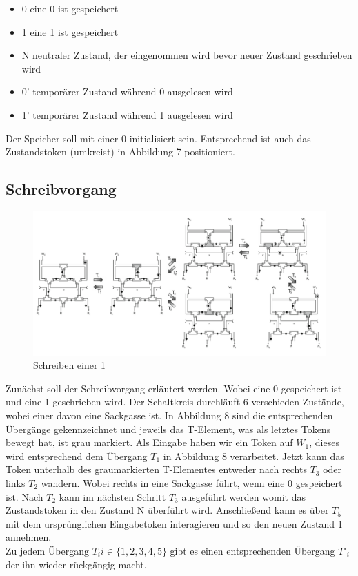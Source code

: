 \documentclass[11pt,a4paper]{article}
\begin{document}
\begin{itemize}
    \item 0 eine 0 ist gespeichert
    \item 1 eine 1 ist gespeichert 
    \item N neutraler Zustand, der eingenommen wird bevor
        neuer Zustand geschrieben wird
    \item 0' temporärer Zustand während 0 ausgelesen wird
    \item 1' temporärer Zustand während 1 ausgelesen wird
\end{itemize}

Der Speicher soll mit einer 0 initialisiert sein.
%
Entsprechend ist auch das Zustandstoken (umkreist) in Abbildung 7 positioniert.


\subsection{Schreibvorgang}

\begin{figure}[h]
      \includegraphics[width=14cm]{bilder/write1Mem.png} 
      \caption{Schreiben einer 1}
\end{figure}

Zunächst soll der Schreibvorgang erläutert werden.
%
Wobei eine 0 gespeichert ist und eine 1 geschrieben wird.
%
Der Schaltkreis durchläuft 6 verschieden Zustände, wobei einer 
davon eine Sackgasse ist.
%
In Abbildung 8 sind die entsprechenden Übergänge gekennzeichnet 
und jeweils das T-Element, was als letztes Tokens bewegt hat, ist grau markiert.
%
Als Eingabe haben wir ein Token auf $ W_{1} $, dieses wird entsprechend 
dem Übergang $ T_{1} $ in Abbildung 8 verarbeitet.
%
Jetzt kann das Token unterhalb des graumarkierten T-Elementes entweder
nach rechts $ T_{3} $ oder links $ T_{2} $ wandern. 
%
Wobei rechts in eine Sackgasse führt, wenn eine 0 gespeichert ist.
%
Nach $ T_{2} $ kann im nächsten Schritt $ T_{3} $ ausgeführt werden
womit das Zustandstoken in den Zustand N überführt wird.
%
Anschließend kann es über $ T_{5} $ mit dem ursprünglichen Eingabetoken
interagieren und so den neuen Zustand 1 annehmen. \\
%
Zu jedem Übergang $ T_{i} i \in \{1, 2, 3, 4, 5\} $ gibt es einen 
entsprechenden Übergang $ T'_{i} $ der ihn wieder rückgängig macht.
\end{document}
